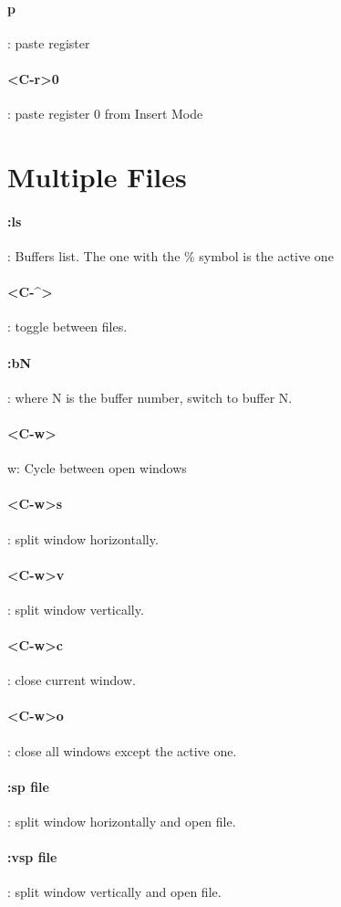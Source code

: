 \documentclass[10pt,letterpaper]{book}
\begin{document}
\paragraph{p}: paste register
\paragraph{<C-r>0}: paste register 0 from Insert Mode
\section{Multiple Files}
\paragraph{:ls}: Buffers list. The one with the \% symbol is the active one
\paragraph{<C-\^{}>}: toggle between files.
\paragraph{:bN}: where N is the buffer number, switch to buffer N.
\paragraph{<C-w>}w: Cycle between open windows
\paragraph{<C-w>s}: split window horizontally.
\paragraph{<C-w>v}: split window vertically.
\paragraph{<C-w>c}: close current window.
\paragraph{<C-w>o}: close all windows except the active one.
\paragraph{:sp {file}}: split window horizontally and open {file}.
\paragraph{:vsp {file}}: split window vertically and open {file}.
\end{document}
